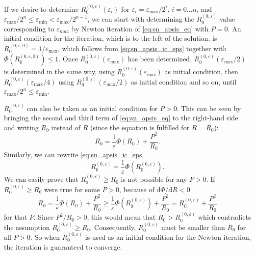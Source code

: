 If we desire to determine $R_0^{(0,\varepsilon)}(\varepsilon_i)$ for $\varepsilon_i = \varepsilon_\mathrm{max}/2^i$, $i = 0 \ldots n$, and $\varepsilon_\mathrm{max}/2^n \le \varepsilon_\mathrm{min} < \varepsilon_\mathrm{max}/2^{n-1}$, we can start with determining the \(R_0^{(0,\varepsilon)}\) value corresponding to \(\varepsilon_{max}\) by Newton iteration of \cref{eq:sn_apsis_eq} with $P=0$.
An initial condition for the iteration, which is to the left of the solution, is \(R_0^{(0,\varepsilon,0)} = 1/\varepsilon_\mathrm{max}\), which follows from \cref{eq:sn_apsis_ic_eps} together with \(\Phi(R_0^{(0,\varepsilon,0)}) \le 1\). Once \(R_0^{(0,\varepsilon)}(\varepsilon_\mathrm{max})\) has been determined, \(R_0^{(0,\varepsilon)}(\varepsilon_\mathrm{max}/2)\) is determined in the same way, using \(R_0^{(0,\varepsilon)}(\varepsilon_\mathrm{max})\) as initial condition, then \(R_0^{(0,\varepsilon)}(\varepsilon_\mathrm{max}/4)\) using \(R_0^{(0,\varepsilon)}(\varepsilon_\mathrm{max}/2)\) as initial condition and so on, until \(\varepsilon_\mathrm{max}/2^n \le \varepsilon_\mathrm{min}\).

$R_0^{(0,\varepsilon)}$ can also be taken as an initial condition for $P > 0$. This can be seen by
bringing the second and third term of \cref{eq:sn_apsis_eq} to the right-hand side and writing $R_0$ instead of $R$ (since the equation is fulfilled for $R = R_0$):
%
\begin{equation*}
    R_0 = \frac{1}{\varepsilon} \Phi(R_0) + \frac{P^2}{R_0} .
\end{equation*}
%
Similarly, we can rewrite \cref{eq:sn_apsis_ic_eps}
%
\begin{equation*}
    R_0^{(0,\varepsilon)} = \frac{1}{\varepsilon} \Phi(R_0^{(0,\varepsilon)}) .
\end{equation*}
%
We can easily prove that $R_0^{(0,\varepsilon)} \ge R_0$ is not possible for any $P > 0$. If $R_0^{(0,\varepsilon)} \ge R_0$ were true for some $P > 0$, because of $\mathrm{d} \Phi / \mathrm{d} R < 0$
%
\begin{equation}
    R_0 = \frac{1}{\varepsilon} \Phi(R_0) + \frac{P^2}{R_0}
        \ge \frac{1}{\varepsilon} \Phi(R_0^{(0,\varepsilon)}) + \frac{P^2}{R_0}
        = R_0^{(0,\varepsilon)} +  \frac{P^2}{R_0}
\end{equation}
%
for that $P$.
Since $P^2 / R_0 > 0$, this would mean that $R_0 > R_0^{(0,\varepsilon)}$ which contradicts the assumption $R_0^{(0,\varepsilon)} \ge R_0$.
Consequently, $R_0^{(0,\varepsilon)}$ must be smaller than $R_0$ for all $P > 0$.
So when $R_0^{(0,\varepsilon)}$ is used as an initial condition for the Newton iteration, the iteration is guaranteed to converge.

